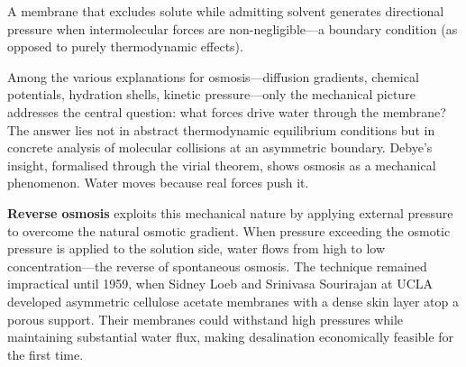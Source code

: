 A membrane that excludes solute while admitting solvent generates directional pressure when intermolecular forces are non-negligible—a boundary condition (as opposed to purely thermodynamic effects).

Among the various explanations for osmosis—diffusion gradients, chemical potentials, hydration shells, kinetic pressure—only the mechanical picture addresses the central question: what forces drive water through the membrane? The answer lies not in abstract thermodynamic equilibrium conditions but in concrete analysis of molecular collisions at an asymmetric boundary. Debye's insight, formalised through the virial theorem, shows osmosis as a mechanical phenomenon. Water moves because real forces push it.

\textbf{Reverse osmosis} exploits this mechanical nature by applying external pressure to overcome the natural osmotic gradient. When pressure exceeding the osmotic pressure is applied to the solution side, water flows from high to low concentration—the reverse of spontaneous osmosis. The technique remained impractical until 1959, when Sidney Loeb and Srinivasa Sourirajan at UCLA developed asymmetric cellulose acetate membranes with a dense skin layer atop a porous support. Their membranes could withstand high pressures while maintaining substantial water flux, making desalination economically feasible for the first time.




